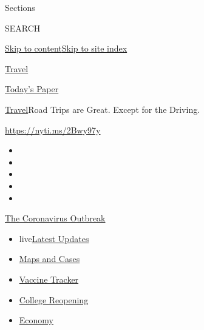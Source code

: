 Sections

SEARCH

\protect\hyperlink{site-content}{Skip to
content}\protect\hyperlink{site-index}{Skip to site index}

\href{https://www.nytimes.com/section/travel}{Travel}

\href{https://myaccount.nytimes.com/auth/login?response_type=cookie\&client_id=vi}{}

\href{https://www.nytimes.com/section/todayspaper}{Today's Paper}

\href{/section/travel}{Travel}\textbar{}Road Trips are Great. Except for
the Driving.

\url{https://nyti.ms/2Bwy97y}

\begin{itemize}
\item
\item
\item
\item
\item
\end{itemize}

\href{https://www.nytimes.com/news-event/coronavirus?action=click\&pgtype=Article\&state=default\&region=TOP_BANNER\&context=storylines_menu}{The
Coronavirus Outbreak}

\begin{itemize}
\tightlist
\item
  live\href{https://www.nytimes.com/2020/08/03/world/coronavirus-covid-19.html?action=click\&pgtype=Article\&state=default\&region=TOP_BANNER\&context=storylines_menu}{Latest
  Updates}
\item
  \href{https://www.nytimes.com/interactive/2020/us/coronavirus-us-cases.html?action=click\&pgtype=Article\&state=default\&region=TOP_BANNER\&context=storylines_menu}{Maps
  and Cases}
\item
  \href{https://www.nytimes.com/interactive/2020/science/coronavirus-vaccine-tracker.html?action=click\&pgtype=Article\&state=default\&region=TOP_BANNER\&context=storylines_menu}{Vaccine
  Tracker}
\item
  \href{https://www.nytimes.com/2020/08/02/us/covid-college-reopening.html?action=click\&pgtype=Article\&state=default\&region=TOP_BANNER\&context=storylines_menu}{College
  Reopening}
\item
  \href{https://www.nytimes.com/live/2020/08/03/business/stock-market-today-coronavirus?action=click\&pgtype=Article\&state=default\&region=TOP_BANNER\&context=storylines_menu}{Economy}
\end{itemize}

